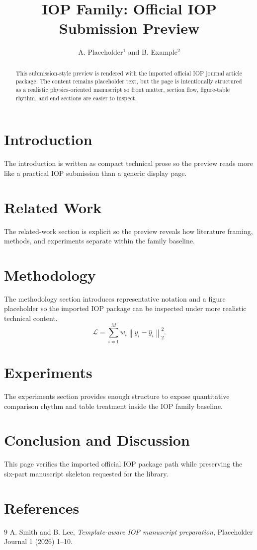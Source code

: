 \documentclass{iopjournal}
\begin{document}
\title{IOP Family: Official IOP Submission Preview}
\author{A. Placeholder$^1$ and B. Example$^2$}
\begin{abstract}
This submission-style preview is rendered with the imported official IOP journal article package. The content remains placeholder text, but the page is intentionally structured as a realistic physics-oriented manuscript so front matter, section flow, figure-table rhythm, and end sections are easier to inspect.
\end{abstract}
\section{Introduction}
The introduction is written as compact technical prose so the preview reads more like a practical IOP submission than a generic display page.
\section{Related Work}
The related-work section is explicit so the preview reveals how literature framing, methods, and experiments separate within the family baseline.
\section{Methodology}
The methodology section introduces representative notation and a figure placeholder so the imported IOP package can be inspected under more realistic technical content.
\begin{equation}
\mathcal{L} = \sum_{i=1}^{M} w_i \left\| y_i - \hat{y}_i \right\|_2^2.
\end{equation}
\section{Experiments}
The experiments section provides enough structure to expose quantitative comparison rhythm and table treatment inside the IOP family baseline.
\section{Conclusion and Discussion}
This page verifies the imported official IOP package path while preserving the six-part manuscript skeleton requested for the library.
\section*{References}
\begin{thebibliography}{9}
 A. Smith and B. Lee, {\it Template-aware IOP manuscript preparation}, Placeholder Journal 1 (2026) 1--10.
\end{thebibliography}
\end{document}
